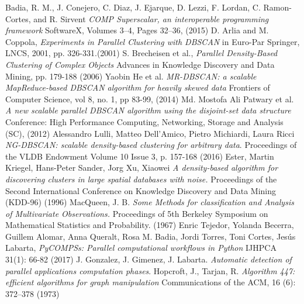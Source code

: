 \documentclass[10pt,journal,compsoc]{IEEEtran}
\begin{document}
\begin{thebibliography}{1}
Badia, R. M., J. Conejero, C. Diaz, J. Ejarque, D. Lezzi, F. Lordan, C. Ramon-Cortes, and R. Sirvent \textit{COMP Superscalar, an interoperable programming framework} SoftwareX, Volumes 3–4, Pages 32–36, (2015)
D. Arlia and M. Coppola, \textit{Experiments in Parallel Clustering
with DBSCAN} in Euro-Par Springer, LNCS, 2001, pp.
326-331.(2001)
 S. Brecheisen et al., \textit{Parallel Density-Based Clustering of Complex Objects} Advances in Knowledge Discovery and
Data Mining, pp. 179-188 (2006)
Yaobin He et al. \textit{MR-DBSCAN: a scalable MapReduce-based DBSCAN algorithm for heavily skewed data} Frontiers of Computer Science, vol 8, no. 1, pp 83-99, (2014)
Md. Mostofa Ali Patwary et al. \textit{A new scalable parallel DBSCAN algorithm using the disjoint-set data structure} Conference: High Performance Computing, Networking, Storage and Analysis (SC), (2012)
Alessandro Lulli, Matteo Dell'Amico, Pietro Michiardi, Laura Ricci \textit{NG-DBSCAN: scalable density-based clustering for arbitrary data}. Proceedings of the VLDB Endowment Volume 10 Issue 3, p. 157-168 (2016)
Ester, Martin Kriegel, Hans-Peter Sander, Jorg Xu, Xiaowei \textit{A density-based algorithm for discovering clusters in large spatial databases with noise.} Proceedings of the Second International Conference on Knowledge Discovery and Data Mining (KDD-96) (1996)
MacQueen, J. B. \textit{Some Methods for classification and Analysis of Multivariate Observations.} Proceedings of 5th Berkeley Symposium on Mathematical Statistics and Probability. (1967)
Enric Tejedor, Yolanda Becerra, Guillem Alomar, Anna Queralt, Rosa M. Badia, Jordi Torres, Toni Cortes, Jesús Labarta, \textit{PyCOMPSs: Parallel computational workflows in Python}  IJHPCA 31(1): 66-82 (2017)
J. Gonzalez, J. Gimenez, J. Labarta. \textit{Automatic detection of parallel applications computation phases}.
    Hopcroft, J., Tarjan, R. \textit{Algorithm 447: efficient algorithms for graph manipulation} Communications of the ACM, 16 (6): 372–378 (1973)
\end{thebibliography}
\end{document}
